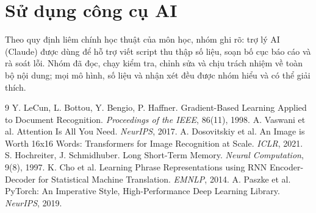 \documentclass[12pt]{article}
\begin{document}
\section{Sử dụng công cụ AI}
Theo quy định liêm chính học thuật của môn học, nhóm ghi rõ: trợ lý AI (Claude) được dùng để hỗ trợ viết script thu thập
số liệu, soạn bố cục báo cáo và rà soát lỗi. Nhóm đã đọc, chạy kiểm tra, chỉnh sửa và chịu trách nhiệm về toàn bộ nội dung;
mọi mô hình, số liệu và nhận xét đều được nhóm hiểu và có thể giải thích.

\begin{thebibliography}{9}
 Y. LeCun, L. Bottou, Y. Bengio, P. Haffner. Gradient-Based Learning Applied to Document Recognition. \emph{Proceedings of the IEEE}, 86(11), 1998.
 A. Vaswani et al. Attention Is All You Need. \emph{NeurIPS}, 2017.
 A. Dosovitskiy et al. An Image is Worth 16x16 Words: Transformers for Image Recognition at Scale. \emph{ICLR}, 2021.
 S. Hochreiter, J. Schmidhuber. Long Short-Term Memory. \emph{Neural Computation}, 9(8), 1997.
 K. Cho et al. Learning Phrase Representations using RNN Encoder-Decoder for Statistical Machine Translation. \emph{EMNLP}, 2014.
 A. Paszke et al. PyTorch: An Imperative Style, High-Performance Deep Learning Library. \emph{NeurIPS}, 2019.
\end{thebibliography}
\end{document}
